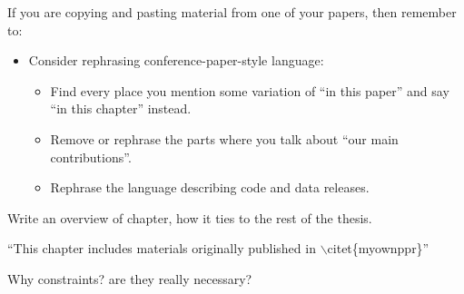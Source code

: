 If you are copying and pasting material from one of your papers, then remember to:
\begin{itemize}
    \item Consider rephrasing conference-paper-style language:
    \begin{itemize}
        \item Find every place you mention some variation of ``in this paper'' and say ``in this chapter'' instead.
        \item Remove or rephrase the parts where you talk about ``our main contributions''.
        \item Rephrase the language describing code and data releases.
    \end{itemize}
\end{itemize}

{\color{orange} Write an overview of chapter, how it ties to the rest of the thesis.}

{\color{orange} ``This chapter includes materials originally published in $\backslash$citet\{myownppr\}''}





Why constraints? are they really necessary?



